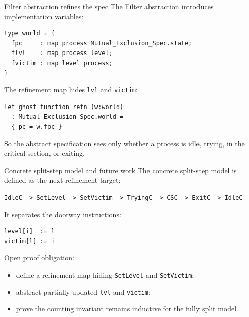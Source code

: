 \documentclass[aspectratio=169,10pt]{beamer}
\begin{document}
\begin{frame}[fragile]{Filter abstraction refines the spec}
The Filter abstraction introduces implementation variables:

\begin{lstlisting}[language=why3]
type world = {
  fpc     : map process Mutual_Exclusion_Spec.state;
  flvl    : map process level;
  fvictim : map level process;
}
\end{lstlisting}

\vspace{0.2cm}
The refinement map hides \texttt{lvl} and \texttt{victim}:

\begin{lstlisting}[language=why3]
let ghost function refn (w:world)
  : Mutual_Exclusion_Spec.world =
  { pc = w.fpc }
\end{lstlisting}

\vspace{0.2cm}
So the abstract specification sees only whether a process is idle, trying, in the critical section, or exiting.
\end{frame}

\begin{frame}[fragile]{Concrete split-step model and future work}
The concrete split-step model is defined as the next refinement target:

\begin{center}
\small
\texttt{IdleC -> SetLevel -> SetVictim -> TryingC -> CSC -> ExitC -> IdleC}
\end{center}

\vspace{0.2cm}
It separates the doorway instructions:
\begin{lstlisting}
level[i]  := l
victim[l] := i
\end{lstlisting}

\vspace{0.2cm}
Open proof obligation:
\begin{itemize}
  \item define a refinement map hiding \texttt{SetLevel} and \texttt{SetVictim};
  \item abstract partially updated \texttt{lvl} and \texttt{victim};
  \item prove the counting invariant remains inductive for the fully split model.
\end{itemize}
\end{frame}
\end{document}
